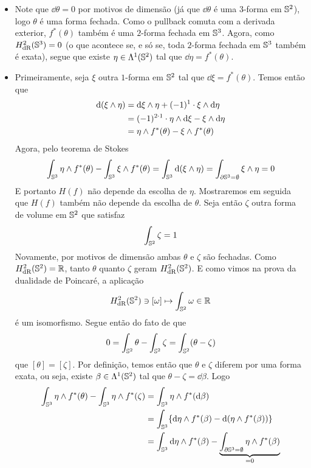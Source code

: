\begin{dem}
\begin{itemize}
\item Note que $\dd \theta = 0$ por motivos de dimensão (já que $\dd \theta$ é uma $3$-forma em $\S^2$), logo $\theta$ é uma forma fechada. Como o pullback comuta com a derivada exterior, $f^{*}(\theta)$ também é uma $2$-forma fechada em $\S^3$. Agora, como $H^2_{\text{dR}}(\S^3) = 0$ (o que acontece se, e só se, toda $2$-forma fechada em $\S^3$ também é exata), segue que existe $\eta \in \Lambda^1(\S^2)$ tal que $\dd \eta = f^{*}(\theta)$.
\item Primeiramente, seja $\xi$ outra $1$-forma em $\S^2$ tal que $\dd \xi = f^{*}(\theta)$. Temos então que
\[ \begin{aligned}
\dd(\xi \wedge \eta) &= \dd \xi \wg \eta + (-1)^1 \cdot  \xi \wedge \dd \eta \\
&= (-1)^{2 \cdot 1} \cdot \eta \wedge \dd \xi - \xi \wg \dd \eta \\
&= \eta \wedge f^{*}(\theta) - \xi \wedge f^{*}(\theta)
\end{aligned}
\]
Agora, pelo teorema de Stokes 
\[
\int_{\S^3} \eta \wedge f^{*}(\theta) - \int_{\S^3} \xi \wedge f^{*}(\theta) = \int_{\S^3} \dd(\xi \wedge \eta) = \int_{\partial \S^3 = \emptyset} \xi \wedge \eta = 0
\]
E portanto $H(f)$ não depende da escolha de $\eta$. Mostraremos em seguida que $H(f)$ também não depende da escolha de $\theta$. Seja então $\zeta$ outra forma de volume em $\S^2$ que satisfaz
\[
\int_{\S^2} \zeta = 1
\]
Novamente, por motivos de dimensão ambas $\theta$ e $\zeta$ são fechadas. Como $H^2_{\text{dR}}(\S^2) = \mathbb{R}$, tanto $\theta$ quanto $\zeta$ geram $H^2_{\text{dR}}(\S^2)$. E como vimos na prova da dualidade de Poincaré, a aplicação
\[
H^{2}_{\text{dR}}(\S^2) \ni [\omega] \mapsto \int_{\S^2} \omega \in \mathbb{R}
\] 
é um isomorfismo. Segue então do fato de que
\[
0 = \int_{\S^2} \theta - \int_{\S^2} \zeta = \int_{\S^2} (\theta - \zeta)
\]
que $[\theta] = [\zeta]$. Por definição, temos então que $\theta$ e $\zeta$ diferem por uma forma exata, ou seja, existe $\beta \in \Lambda^1(\S^2)$ tal que $\theta - \zeta = \dd \beta$. Logo
\begin{align*}
\int_{\S^3} \eta \wg f^{*}(\theta) - \int_{\S^3} \eta \wedge f^{*}(\zeta) &= \int_{\S^3} \eta \wg f^{*}(\dd \beta) \\
&= \int_{\S^3} \{ \dd \eta \wedge f^{*}( \beta) - \dd(\eta \wedge f^{*}(\beta)) \} \\
&= \int_{\S^3} \dd \eta \wedge f^{*}( \beta) - \underbrace{ \int_{\partial \S^3 = \emptyset} \eta \wg f^{*}(\beta) }_{=0} \\

\end{align*}
\end{itemize}
\end{dem}
